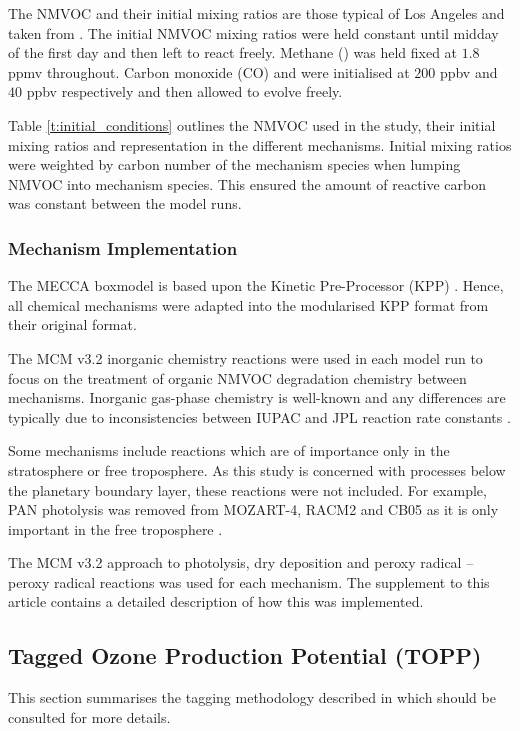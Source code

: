 The NMVOC and their initial mixing ratios are those typical of Los Angeles and taken from \citet{Baker:2008}. 
The initial NMVOC mixing ratios were held constant until midday of the first day and then left to react freely. 
Methane () was held fixed at $1.8$ ppmv throughout. 
Carbon monoxide (CO) and  were initialised at $200$ ppbv and $40$ ppbv respectively and then allowed to evolve freely.

Table \ref{t:initial_conditions} outlines the NMVOC used in the study, their initial mixing ratios and representation in the different mechanisms.
Initial mixing ratios were weighted by carbon number of the mechanism species when lumping NMVOC into mechanism species. 
This ensured the amount of reactive carbon was constant between the model runs.

\subsubsection{Mechanism Implementation} %

The MECCA boxmodel \citep{Sander:2011} is based upon the Kinetic Pre-Processor (KPP) \citep{Damian:2002}. 
Hence, all chemical mechanisms were adapted into the modularised KPP format from their original format.

The MCM v3.2 inorganic chemistry reactions were used in each model run to focus on the treatment of organic NMVOC degradation chemistry between mechanisms. 
Inorganic gas-phase chemistry is well-known and any differences are typically due to inconsistencies between IUPAC and JPL reaction rate constants \citep{Emmerson:2009}.

Some mechanisms include reactions which are of importance only in the stratosphere or free troposphere. 
As this study is concerned with processes below the planetary boundary layer, these reactions were not included. 
For example, PAN photolysis was removed from MOZART-4, RACM2 and CB05 as it is only important in the free troposphere \citep{Harwood:2003}.  

The MCM v3.2 approach to photolysis, dry deposition and peroxy radical -- peroxy radical reactions was used for each mechanism. 
The supplement to this article contains a detailed description of how this was implemented.

\subsection{Tagged Ozone Production Potential (TOPP)}
This section summarises the tagging methodology described in \citet{Butler:2011} which should be consulted for more details.

